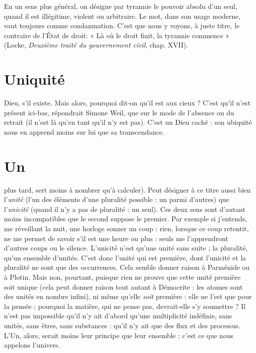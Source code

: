En un sens plus général, on désigne par tyrannie le pouvoir absolu d’un
seul, quand il est illégitime, violent ou arbitraire. Le mot, dans son usage
moderne, vaut toujours comme condamnation. C’est que nous y voyons, à
juste titre, le contraire de l’État de droit: « Là où le droit finit, la tyrannie
commence » (Locke, {\it Deuxième traité du gouvernement civil}, chap. XVII).

\section{Uniquité}
Dieu, s’il existe. Mais alors, pourquoi dit-on qu’il est aux
cieux ? C’est qu’il n’est présent ici-bas, répondrait Simone Weil, que sur le
mode de l'absence ou du retrait (il n’est là qu’en tant qu’il n’y est pas). C’est un
Dieu caché : son ubiquité nous en apprend moins sur lui que sa transcendance.

\section{Un}
plus tard, sert moins à nombrer qu’à calculer). Peut désigner à ce
titre aussi bien l’{\it unité} (l’un des éléments d’une pluralité possible : un parmi
d’autres) que l’{\it unicité} (quand il n’y a pas de pluralité : un seul). Ces deux
sens sont d’autant moins incompatibles que le second suppose le premier.
Par exemple si j'entends, me réveillant la nuit, une horloge sonner un coup :
rien, lorsque ce coup retentit, ne me permet de savoir s’il est une heure ou
plus : seuls me l’apprendront d’autres coups ou le silence. L’unicité n’est
qu’une unité sans suite ; la pluralité, qu’un ensemble d’unités. C’est donc
l'unité qui est première, dont l’unicité et la pluralité ne sont que des occurrences.
Cela semble donner raison à Parménide ou à Plotin. Mais non, pourtant,
puisque rien ne prouve que cette unité première soit unique (cela peut
donner raison tout autant à Démocrite : les atomes sont des unités en
nombre infini), ni même qu’elle {\it soit} première : elle ne l’est que pour la
pensée ; pourquoi la matière, qui ne pense pas, devrait-elle s’y soumettre ? Il
n’est pas impossible qu’il n’y ait d’abord qu’une multiplicité indéfinie, sans
unités, sans êtres, sans substances : qu’il n’y ait que des flux et des processus.
L'Un, alors, serait moins leur principe que leur ensemble : c’est ce que nous
appelons l’univers.

